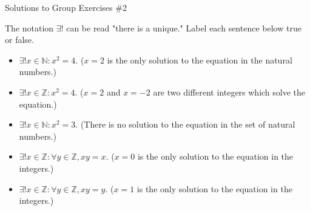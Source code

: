 \documentclass[10pt]{beamer}
\begin{document}
\begin{frame}{Solutions to Group Exercises \#2}

The notation $\exists!$ can be read "there is a unique." Label each sentence below true or false.

    \begin{itemize}
        \item[a.] $\exists! x \in \mathbb{N}: x^2=4.$     ($x=2$ is the only solution to the equation in the natural numbers.)
        \item[b.] $\exists! x \in \mathbb{Z}: x^2=4.$      ($x=2$ and $x=-2$ are two different integers which solve the equation.)
        \item[c.] $\exists! x \in \mathbb{N}: x^2=3.$      (There is no solution to the equation in the set of natural numbers.)
        \item[d.] $\exists! x \in \mathbb{Z}: \forall y \in \mathbb{Z}, xy=x.$     ($x=0$ is the only solution to the equation in the integers.)
        \item[e.] $\exists! x \in \mathbb{Z}: \forall y \in \mathbb{Z}, xy=y.$    ($x=1$ is the only solution to the equation in the integers.)
    \end{itemize}


\end{frame}
\end{document}
